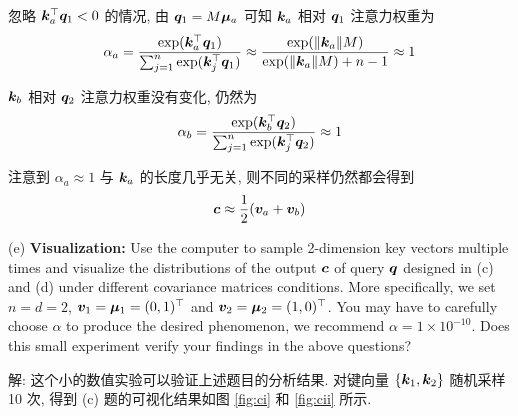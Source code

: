 \documentclass{article}
\begin{document}
忽略 $\bm{k}_{a}^{\top}\bm{q}_1<0$ 的情况, 由 $\bm{q}_1=M\bm{\mu}_a$ 可知 $\bm{k}_a$ 相对 $\bm{q}_1$ 注意力权重为
\begin{equation}
  \alpha_a
  =\frac{\exp(\bm{k}_{a}^{\top}\bm{q}_1)}{\sum_{j=1}^{n}\exp(\bm{k}_{j}^{\top}\bm{q}_1)}
  \approx\frac{\exp(\|\bm{k}_a\|M)}{\exp(\|\bm{k}_a\|M)+n-1}
  \approx1
\end{equation}

$\bm{k}_b$ 相对 $\bm{q}_2$ 注意力权重没有变化, 仍然为
\begin{equation}
  \alpha_b
  =\frac{\exp(\bm{k}_{b}^{\top}\bm{q}_2)}{\sum_{j=1}^{n}\exp(\bm{k}_{j}^{\top}\bm{q}_2)}
  \approx1
\end{equation}

注意到 $\alpha_a\approx1$ 与 $\bm{k}_a$ 的长度几乎无关, 则不同的采样仍然都会得到
\begin{equation}
  \bm{c}\approx\frac{1}{2}(\bm{v}_{a}+\bm{v}_{b})
\end{equation}

(e) \textbf{Visualization:} Use the computer to sample 2-dimension key vectors multiple times and visualize the distributions of the output $\bm{c}$ of query $\bm{q}$ designed in (c) and (d) under different covariance matrices conditions. More specifically, we set $n = d = 2$, $\bm{v}_1 = \bm{\mu}_{1} = (0, 1)^\top$ and $\bm{v}_2 = \bm{\mu}_{2} = (1, 0)^\top$. You may have to carefully choose $\alpha$ to produce the desired phenomenon, we recommend $\alpha = 1\times10^{-10}$. Does this small experiment verify your findings in the above questions?

解: 这个小的数值实验可以验证上述题目的分析结果. 对键向量 $\{\bm{k}_1,\bm{k}_2\}$ 随机采样 10 次, 得到 (c) 题的可视化结果如图 \ref{fig:ci} 和 \ref{fig:cii} 所示.
\end{document}
